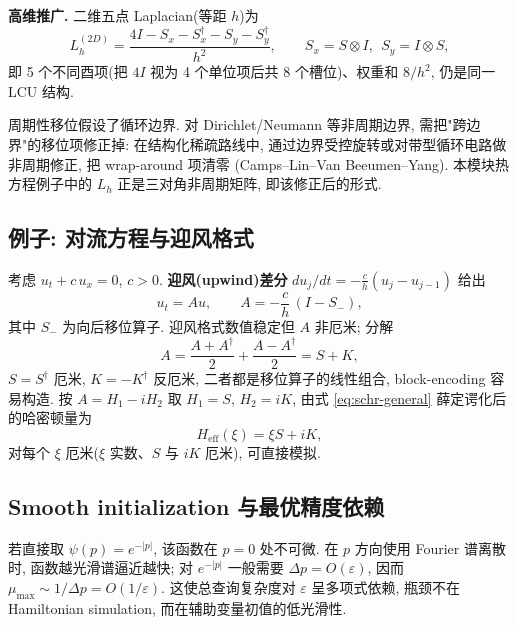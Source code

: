 \documentclass[utf8]{article} %
\numberwithin{equation}{section}   %
\newtheorem{Note}{\hskip 2em {\color{red} 注}}[subsection]
\newtheorem{Eg}{\hskip 2em {\color{black} 例}}[subsection]
\begin{document}
\textbf{高维推广.} 二维五点 Laplacian(等距 $h$)为
\begin{equation}
    L_h^{(2D)} = \frac{4I - S_x - S_x^\dagger - S_y - S_y^\dagger}{h^2},
    \qquad S_x = S\otimes I,\ \ S_y = I\otimes S,
\end{equation}
即 5 个不同酉项(把 $4I$ 视为 4 个单位项后共 8 个槽位)、权重和 $8/h^2$, 仍是同一 LCU 结构.

\begin{Note}[边界条件]
    周期性移位假设了循环边界. 对 Dirichlet/Neumann 等非周期边界, 需把"跨边界"的移位项修正掉:
    在结构化稀疏路线中, 通过边界受控旋转或对带型循环电路做非周期修正, 把 wrap-around 项清零
    (Camps--Lin--Van Beeumen--Yang). 本模块热方程例子中的 $L_h$ 正是三对角非周期矩阵,
    即该修正后的形式.
\end{Note}

\subsection{例子: 对流方程与迎风格式}

\begin{Eg}[一维对流方程]
    考虑 $u_t + c\,u_x = 0$, $c > 0$. \textbf{迎风(upwind)差分}
    $du_j/dt = -\frac{c}{h}(u_j - u_{j-1})$ 给出
    \begin{equation}
        u_t = A u, \qquad A = -\frac{c}{h}\,(I - S_-),
    \end{equation}
    其中 $S_-$ 为向后移位算子. 迎风格式数值稳定但 $A$ 非厄米; 分解
    \begin{equation}
        A = \frac{A + A^\dagger}{2} + \frac{A - A^\dagger}{2} = S + K,
    \end{equation}
    $S = S^\dagger$ 厄米, $K = -K^\dagger$ 反厄米, 二者都是移位算子的线性组合,
    block-encoding 容易构造. 按 $A = H_1 - iH_2$ 取 $H_1 = S$,
    $H_2 = iK$, 由式 \eqref{eq:schr-general} 薛定谔化后的哈密顿量为
    \begin{equation}
        H_{\mathrm{eff}}(\xi) = \xi S + iK,
    \end{equation}
    对每个 $\xi$ 厄米($\xi$ 实数、$S$ 与 $iK$ 厄米), 可直接模拟.
\end{Eg}

\subsection{Smooth initialization 与最优精度依赖}

\begin{Note}[初值光滑性是精度的主要瓶颈]
    若直接取 $\psi(p) = e^{-|p|}$, 该函数在 $p = 0$ 处不可微. 在 $p$ 方向使用
    Fourier 谱离散时, 函数越光滑谱逼近越快; 对 $e^{-|p|}$ 一般需要
    $\Delta p = O(\varepsilon)$, 因而 $\mu_{\max} \sim 1/\Delta p = O(1/\varepsilon)$.
    这使总查询复杂度对 $\varepsilon$ 呈多项式依赖, 瓶颈不在 Hamiltonian simulation,
    而在辅助变量初值的低光滑性.
\end{Note}
\end{document}
